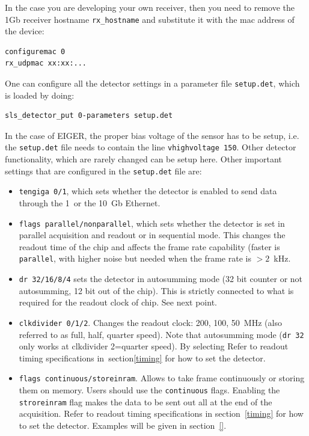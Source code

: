 \documentclass{article}
\newcommand{\E}{EIGER\xspace}
\begin{document}
In the case you are developing your own receiver, then you need to remove the 1Gb receiver hostname {\tt{rx\_hostname}} and substitute it with the mac address of the device:
\begin{verbatim}
configuremac 0
rx_udpmac xx:xx:...
\end{verbatim}


One can configure all the detector settings in a parameter file {\tt{setup.det}}, which is loaded by doing:
\begin{verbatim}
sls_detector_put 0-parameters setup.det
\end{verbatim}

In the case of \E, the proper bias voltage of the sensor has to be setup, i.e. the {\tt{setup.det}} file needs to contain the line {\tt{vhighvoltage 150}}. Other detector functionality, which are rarely changed can be setup here. 
Other important settings that are configured in the {\tt{setup.det}} file are:
\begin{itemize}
\item {\tt{tengiga 0/1}}, which sets whether the detector is enabled to send data through the 1~or the 10~Gb Ethernet.
\item {\tt{flags parallel/nonparallel}}, which sets whether the detector is set in parallel acquisition and readout or in sequential mode. This changes the readout time of the chip and affects the frame rate capability (faster is {\tt{parallel}}, with higher noise but needed when the frame rate is $>2$~kHz. 
\item {\tt{dr 32/16/8/4}} sets the detector in autosumming mode (32 bit counter or not autosumming, 12 bit out of the chip). This is strictly connected to what is required for the readout clock of chip. See next point.
\item {\tt{clkdivider 0/1/2}}. Changes the readout clock: 200, 100, 50~MHz (also referred to as full, half, quarter speed). Note that autosumming mode ({\tt{dr 32}} only works at {clkdivider 2}=quarter speed). By selecting Refer to readout timing specifications in~section\ref{timing} for how to set the detector. 
\item {\tt{flags continuous/storeinram}}. Allows to take frame continuously or storing them on memory. Users should use the {\tt{continuous}} flags. Enabling the {\tt{stroreinram}} flag makes the data to be sent out all at the end of the acquisition. Refer to readout timing specifications in section~\ref{timing} for how to set the detector. Examples will be given in section~\ref{}.
\end{itemize}
\end{document}
